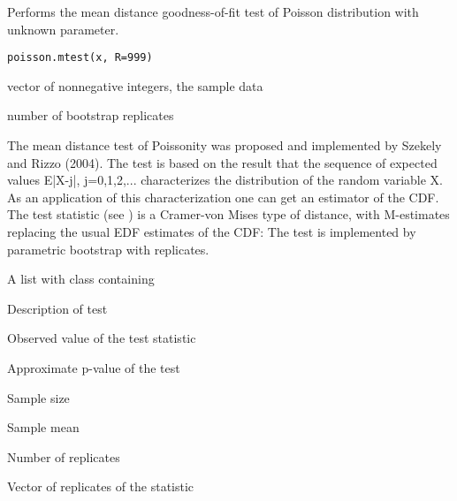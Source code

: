 \begin{Description}\relax
Performs the mean distance goodness-of-fit test of Poisson distribution
with unknown parameter.
\end{Description}
\begin{Usage}
\begin{verbatim}
poisson.mtest(x, R=999)
\end{verbatim}
\end{Usage}
\begin{Arguments}
\begin{ldescription}
\item[\code{x}] vector of nonnegative integers, the sample data 
\item[\code{R}] number of bootstrap replicates 
\end{ldescription}
\end{Arguments}
\begin{Details}\relax
The mean distance test of Poissonity was proposed and implemented by 
Szekely and Rizzo (2004). The test is based on the result that the sequence 
of expected values E|X-j|, j=0,1,2,... characterizes the distribution of 
the random  variable X. As an application of this characterization one can 
get an estimator  of the CDF. The test statistic 
(see ) is a Cramer-von Mises type of distance, with 
M-estimates replacing the usual EDF estimates of the CDF:
 The test is implemented by parametric bootstrap with 
 replicates.
\end{Details}
\begin{Value}
A list with class  containing
\begin{ldescription}
\item[\code{method}] Description of test
\item[\code{statistic}] Observed value of the test statistic
\item[\code{p.value}] Approximate p-value of the test
\item[\code{n}] Sample size
\item[\code{lambda}] Sample mean
\item[\code{R}] Number of replicates
\item[\code{replicates}] Vector of replicates of the statistic
\end{ldescription}
\end{Value}
